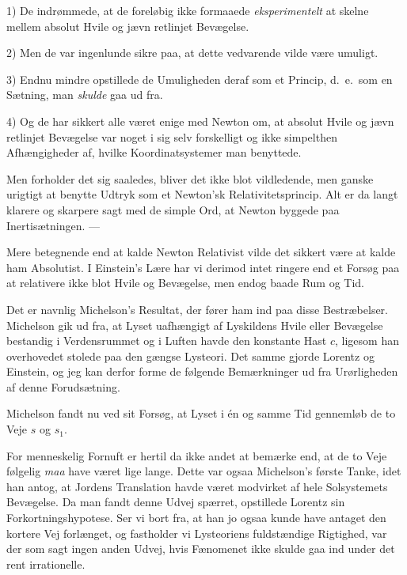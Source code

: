 \documentclass[12pt,a4paper]{article}
\newcommand{\opage}[1]{\marginnote{\footnotesize\textit{[#1]}}}
\begin{document}
1) De indrømmede, at de foreløbig ikke formaaede \emph{eksperimentelt} at
skelne mellem absolut Hvile og jævn retlinjet Bevægelse.

\opage{197} 2) Men de var ingenlunde sikre paa, at dette vedvarende vilde være umuligt.

3) Endnu mindre opstillede de Umuligheden deraf som et Princip, d.\ e.\ som en
Sætning, man \emph{skulde} gaa ud fra.

4) Og de har sikkert alle været enige med Newton om, at absolut Hvile og jævn
retlinjet Bevægelse var noget i sig selv forskelligt og ikke simpelthen
Afhængigheder af, hvilke Koordinatsystemer man benyttede.

Men forholder det sig saaledes, bliver det ikke blot vildledende, men ganske
urigtigt at benytte Udtryk som \guillemotright et Newton'sk
Relativitetsprincip\guillemotleft. Alt er da langt klarere og skarpere sagt
med de simple Ord, at Newton byggede paa Inertisætningen. ---

Mere betegnende end at kalde Newton Relativist vilde det sikkert være at kalde
ham Absolutist. I Einstein's Lære har vi derimod intet ringere end et Forsøg
paa at relativere ikke blot Hvile og Bevægelse, men endog baade Rum og Tid.

Det er navnlig Michelson's Resultat, der fører ham ind paa disse Bestræbelser.
Michelson gik ud fra, at Lyset uafhængigt af Lyskildens Hvile eller Bevægelse
bestandig i Verdensrummet og i Luften havde den konstante Hast $c$, ligesom
han overhovedet stolede paa den gængse Lysteori. Det samme gjorde Lorentz og
Einstein, og jeg kan derfor forme de følgende Bemærkninger ud fra Urørligheden
af denne Forudsætning.

Michelson fandt nu ved sit Forsøg, at Lyset i én og samme Tid gennemløb de to
Veje $s$ og $s_{1}$.

For menneskelig Fornuft er hertil da ikke andet at bemærke end, at de to Veje
følgelig \emph{maa} have været lige lange. Dette var ogsaa Michelson's første
Tanke, idet han antog, at Jordens Translation havde været modvirket af hele
Solsystemets Bevægelse. Da man fandt denne Udvej spærret, opstillede Lorentz
sin Forkortningshypotese. Ser vi bort fra, at han jo ogsaa kunde have antaget
den kortere Vej forlænget, og fastholder vi Lysteoriens fuldstændige Rigtighed,
var der som sagt ingen anden Udvej, hvis Fænomenet ikke skulde gaa ind under
det rent irrationelle.
\end{document}

